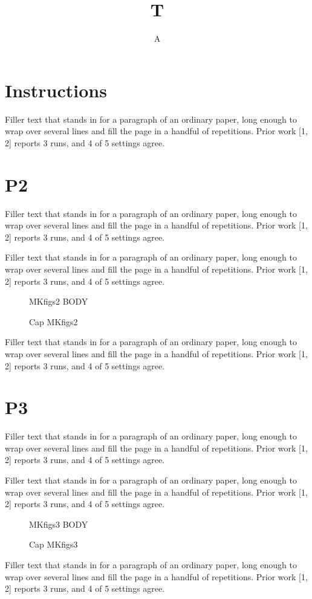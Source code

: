\documentclass[titlepage]{article}
\title{T}\author{A}
\begin{document}
\maketitle
\section{Instructions}
Filler text that stands in for a paragraph of an ordinary paper, long enough to wrap over several lines and fill the page in a handful of repetitions. Prior work [1, 2] reports 3 runs, and 4 of 5 settings agree.\par
\section{P2}
Filler text that stands in for a paragraph of an ordinary paper, long enough to wrap over several lines and fill the page in a handful of repetitions. Prior work [1, 2] reports 3 runs, and 4 of 5 settings agree.\par
Filler text that stands in for a paragraph of an ordinary paper, long enough to wrap over several lines and fill the page in a handful of repetitions. Prior work [1, 2] reports 3 runs, and 4 of 5 settings agree.\par
\begin{figure}[h]\centering MKfigs2 BODY\caption{Cap MKfigs2}\label{fig:s2}\end{figure}
Filler text that stands in for a paragraph of an ordinary paper, long enough to wrap over several lines and fill the page in a handful of repetitions. Prior work [1, 2] reports 3 runs, and 4 of 5 settings agree.\par
\newpage\section{P3}
Filler text that stands in for a paragraph of an ordinary paper, long enough to wrap over several lines and fill the page in a handful of repetitions. Prior work [1, 2] reports 3 runs, and 4 of 5 settings agree.\par
Filler text that stands in for a paragraph of an ordinary paper, long enough to wrap over several lines and fill the page in a handful of repetitions. Prior work [1, 2] reports 3 runs, and 4 of 5 settings agree.\par
\begin{figure}[h]\centering MKfigs3 BODY\caption{Cap MKfigs3}\label{fig:s3}\end{figure}
Filler text that stands in for a paragraph of an ordinary paper, long enough to wrap over several lines and fill the page in a handful of repetitions. Prior work [1, 2] reports 3 runs, and 4 of 5 settings agree.\par
\end{document}
